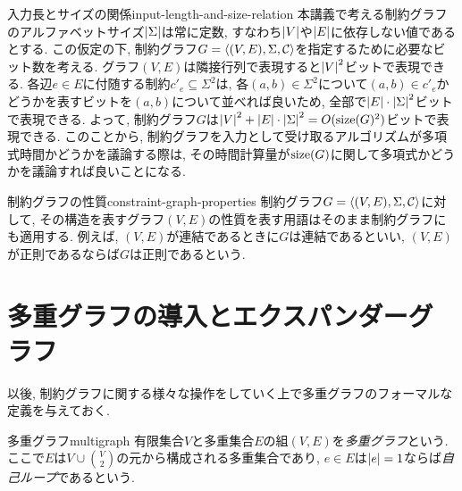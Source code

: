 \begin{remark}{入力長とサイズの関係}{input-length-and-size-relation}
  本講義で考える制約グラフのアルファベットサイズ$\abs{\Sigma}$は常に定数, すなわち$\abs{V}$や$\abs{E}$に依存しない値であるとする.
  この仮定の下, 制約グラフ$G=\langle(V,E),\Sigma,\mathcal{C}\rangle$を指定するために必要なビット数を考える.
  グラフ$(V,E)$は隣接行列で表現すると$\abs{V}^2$ビットで表現できる.
  各辺$e\in E$に付随する制約$c'_e\subseteq\Sigma^2$は, 各$(a,b)\in\Sigma^2$について$(a,b)\in c'_e$かどうかを表すビットを$(a,b)$について並べれば良いため, 全部で$\abs{E}\cdot\abs{\Sigma}^2$ビットで表現できる.
  よって, 制約グラフ$G$は$\abs{V}^2+\abs{E}\cdot\abs{\Sigma}^2 = O(\mathrm{size}(G)^2)$ビットで表現できる.
  このことから, 制約グラフを入力として受け取るアルゴリズムが多項式時間かどうかを議論する際は, その時間計算量が$\mathrm{size}(G)$に関して多項式かどうかを議論すれば良いことになる.
\end{remark}

\begin{remark}{制約グラフの性質}{constraint-graph-properties}
  制約グラフ$G=\langle(V,E),\Sigma,\mathcal{C}\rangle$に対して, その構造を表すグラフ$(V,E)$の性質を表す用語はそのまま制約グラフにも適用する.
  例えば, $(V,E)$が連結であるときに$G$は連結であるといい, $(V,E)$が正則であるならば$G$は正則であるという.
\end{remark}

\section{多重グラフの導入とエクスパンダーグラフ}

以後, 制約グラフに関する様々な操作をしていく上で多重グラフのフォーマルな定義を与えておく.

\begin{definition}{多重グラフ}{multigraph}
有限集合$V$と多重集合$E$の組$(V,E)$を\emph{多重グラフ}という.
ここで$E$は$V\cup \binom{V}{2}$の元から構成される多重集合であり, $e\in E$は$\abs{e}=1$ならば\emph{自己ループ}であるという.
\end{definition}

